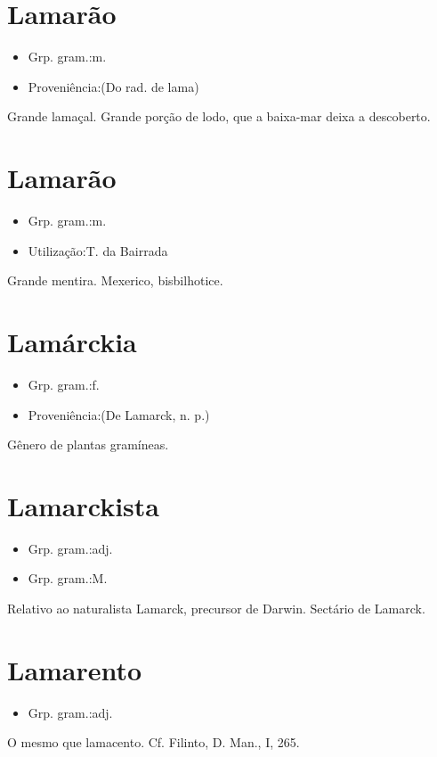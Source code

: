 \section{Lamarão}
\begin{itemize}
\item {Grp. gram.:m.}
\end{itemize}
\begin{itemize}
\item {Proveniência:(Do rad. de \textunderscore lama\textunderscore )}
\end{itemize}
Grande lamaçal.
Grande porção de lodo, que a baixa-mar deixa a descoberto.
\section{Lamarão}
\begin{itemize}
\item {Grp. gram.:m.}
\end{itemize}
\begin{itemize}
\item {Utilização:T. da Bairrada}
\end{itemize}
Grande mentira.
Mexerico, bisbilhotice.
\section{Lamárckia}
\begin{itemize}
\item {Grp. gram.:f.}
\end{itemize}
\begin{itemize}
\item {Proveniência:(De \textunderscore Lamarck\textunderscore , n. p.)}
\end{itemize}
Gênero de plantas gramíneas.
\section{Lamarckista}
\begin{itemize}
\item {Grp. gram.:adj.}
\end{itemize}
\begin{itemize}
\item {Grp. gram.:M.}
\end{itemize}
Relativo ao naturalista Lamarck, precursor de Darwin.
Sectário de Lamarck.
\section{Lamarento}
\begin{itemize}
\item {Grp. gram.:adj.}
\end{itemize}
O mesmo que \textunderscore lamacento\textunderscore . Cf. Filinto, \textunderscore D. Man.\textunderscore , I, 265.

